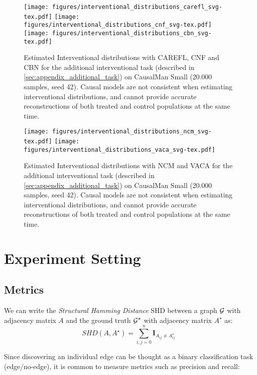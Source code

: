 \begin{figure*}[ht]
\centering
\texttt{[image: figures/interventional\_distributions\_carefl\_svg-tex.pdf]}
\texttt{[image: figures/interventional\_distributions\_cnf\_svg-tex.pdf]}
\texttt{[image: figures/interventional\_distributions\_cbn\_svg-tex.pdf]}
\caption{Estimated Interventional distributions with CAREFL, CNF and CBN for the additional interventional task (described in \ref{sec:appendix_additional_task}) on CausalMan Small (20.000 samples, seed 42). Causal models are not consistent when estimating interventional distributions, and cannot provide accurate reconstructions of both treated and control populations at the same time.}
\label{fig:interventional_distributions_1_task_1_causalman_small}
\end{figure*}
\begin{figure*}[ht]
\centering
\texttt{[image: figures/interventional\_distributions\_ncm\_svg-tex.pdf]}
\texttt{[image: figures/interventional\_distributions\_vaca\_svg-tex.pdf]}
\caption{Estimated Interventional distributions with NCM and VACA for the additional interventional task (described in \ref{sec:appendix_additional_task}) on CausalMan Small (20.000 samples, seed 42). Causal models are not consistent when estimating interventional distributions, and cannot provide accurate reconstructions of both treated and control populations at the same time.}
\label{fig:interventional_distributions_2_task_1_causalman_small}
\end{figure*}
\section{Experiment Setting}

\subsection{Metrics} \label{sec:appendix_metrics}

We can write the \textit{Structural Hamming Distance} SHD between a graph $\displaystyle {\mathcal{G}}$ with adjacency matrix $A$ and the ground truth $\displaystyle {\mathcal{G}}^\star$ with adjacency matrix $A^\star$ as:
\begin{equation}
    SHD(A, A^\star) = \sum_{i,j = 0}^n \mathbf{I}_{A_{ij} \neq A^\star_{ij}}
\end{equation}

Since discovering an individual edge can be thought as a binary classification task (edge/no-edge), it  is common to measure metrics such as precision and recall:


